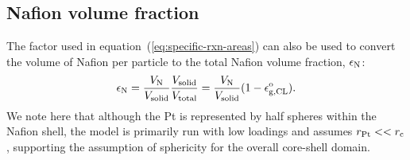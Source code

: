 \documentclass[final,3p,times,onecolumn]{elsarticle}    %
\begin{document}
\subsection{Nafion volume fraction}
The factor used in equation~(\ref{eq:specific-rxn-areas}) can also be used to convert the volume of Nafion per particle to the total Nafion volume fraction, $\epsilon_{\rm N}$:
\begin{equation}
    \epsilon_{\rm N} = \frac{V_{\rm N}}{V_{\rm solid}} \frac{V_{\rm solid}}{V_{\rm total}}
                     = \frac{V_{\rm N}}{V_{\rm solid}} (1 - \epsilon_{\rm g,CL}^{\rm o}).
\end{equation}
We note here that although the Pt is represented by half spheres within the Nafion shell, the model is primarily run with low loadings and assumes $r_{\rm Pt} << r_{\rm c}$, supporting the assumption of sphericity for the overall core-shell domain. 

\end{document}
